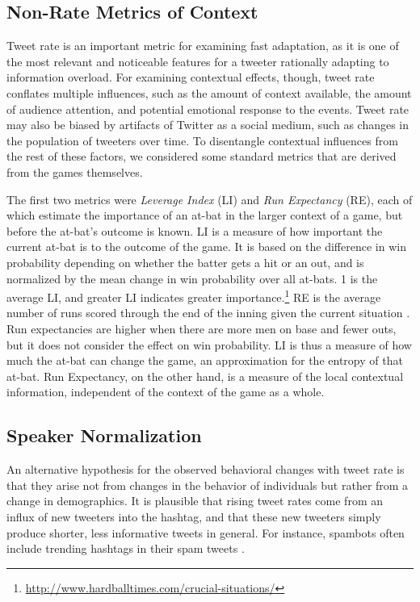 \documentclass[11pt,letterpaper]{article}
\begin{document}
\subsection{Non-Rate Metrics of Context}\label{sect:other-metrics}
Tweet rate is an important metric for examining fast adaptation, as it is one of the most relevant and noticeable features for a tweeter rationally adapting to information overload. For examining contextual effects, though, tweet rate conflates multiple influences, such as the amount of context available, the amount of audience attention, and potential emotional response to the events.  Tweet rate may also be biased by artifacts of Twitter as a social medium, such as changes in the population of tweeters over time.  To disentangle contextual influences from the rest of these factors, we considered some standard metrics that are derived from the games themselves.

The first two metrics were {\it Leverage Index} (LI) and {\it Run Expectancy} (RE), each of which estimate the importance of an at-bat in the larger context of a game, but before the at-bat's outcome is known.  LI is a measure of how important the current at-bat is to the outcome of the game. It is based on the difference in win probability depending on whether the batter gets a hit or an out, and is normalized by the mean change in win probability over all at-bats. 1 is the average LI, and greater LI indicates greater importance.\footnote{\url{http://www.hardballtimes.com/crucial-situations/}}  RE is the average number of runs scored through the end of the inning given the current situation \cite{tango2006}. Run expectancies are higher when there are more men on base and fewer outs, but it does not consider the effect on win probability.  LI is thus a measure of how much the at-bat can change the game, an approximation for the entropy of that at-bat.  Run Expectancy, on the other hand, is a measure of the local contextual information, independent of the context of the game as a whole.

\subsection{Speaker Normalization}

An alternative hypothesis for the observed behavioral changes with tweet rate is that they arise not from changes in the behavior of individuals but rather from a change in demographics.  It is plausible that rising tweet rates come from an influx of new tweeters into the hashtag, and that these new tweeters simply produce shorter, less informative tweets in general.  For instance, spambots often include trending hashtags in their spam tweets \cite{martinez2013}.
\end{document}
